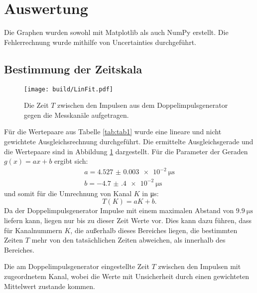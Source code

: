 \section{Auswertung}
\label{sec:Auswertung}


Die Graphen wurden sowohl mit Matplotlib \cite{matplotlib} als auch NumPy \cite{numpy} erstellt. Die
Fehlerrechnung wurde mithilfe von Uncertainties \cite{uncertainties} durchgeführt.


\subsection{Bestimmung der Zeitskala}
\begin{figure}
	\centering
	\texttt{[image: build/LinFit.pdf]}
	\caption{Die Zeit $T$ zwischen den Impulsen aus dem Doppelimpulsgenerator gegen die Messkanäle aufgetragen.}
	\label{fig:erste}
\end{figure}

Für die Wertepaare aus Tabelle \ref{tab:tab1}  wurde eine lineare und nicht gewichtete Ausgleichsrechnung durchgeführt. Die ermittelte Ausgleichsgerade und die Wertepaare sind in Abbildung \ref{fig:erste} dargestellt. Für die Parameter der Geraden $g(x)=a x + b$ ergibt sich:
\begin{gather*}
a=\SI{4.527(3)e-2}{\micro\second}\\
b=\SI{-4.7(4)e-2}{\micro\second}
\end{gather*}
und somit für die Umrechnung von Kanal $K$ in \si{\micro\second}:
\begin{equation}
T(K)=a K + b. \label{eq:umrechnung}
\end{equation}
Da der Doppelimpulsgenerator Impulse mit einem maximalen Abstand von $\SI{9.9}{\micro\second}$ liefern kann, liegen nur bis zu dieser Zeit Werte vor. Dies kann dazu führen, dass für Kanalnummern $K$, die außerhalb dieses Bereiches liegen, die bestimmten Zeiten $T$ mehr von den tatsächlichen Zeiten abweichen, als innerhalb des Bereiches.
\begin{table}
	\centering
	\caption{Die am Doppelimpulsgenerator eingestellte Zeit $T$ zwischen den Impulsen mit zugeordnetem Kanal, wobei die Werte mit Unsicherheit durch einen gewichteten Mittelwert zustande kommen.}
	
\end{table}
